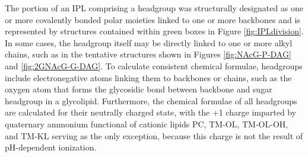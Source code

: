 

The portion of an IPL comprising a headgroup was structurally designated as one or more covalently bonded polar moieties linked to one or more backbones and is represented by structures contained within green boxes in Figure \ref{fig:IPLdivision}. In some cases, the headgroup itself may be directly linked to one or more alkyl chains, such as in the tentative structures shown in Figures \ref{fig:NAcG-P-DAG} and \ref{fig:2GNAcG-G-DAG}. To calculate consistent chemical formulae, headgroups include electronegative atoms linking them to backbones or chains, such as the oxygen atom that forms the glycosidic bond between backbone and sugar headgroup in a glycolipid. Furthermore, the chemical formulae of all headgroups are calculated for their neutrally charged state, with the +1 charge imparted by quaternary ammonium functional of cationic lipids PC, TM-OL, TM-OL-OH, and TM-KL serving as the only exception, because this charge is not the result of pH-dependent ionization.

